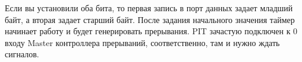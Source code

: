 Если вы установили оба бита, то первая запись в порт данных задает младший байт,
а вторая задает старший байт. После задания начального значения таймер начинает
работу и будет генерировать прерывания. PIT зачастую подключен к 0 входу Master
контроллера прерываний, соответственно, там и нужно ждать сигналов.
